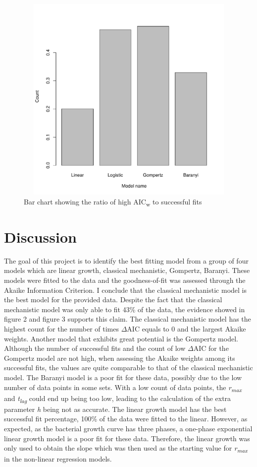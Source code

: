 \documentclass[11pt]{article}
\begin{document}
\begin{figure}[H]
\includegraphics[keepaspectratio, width = 5in, height = 4in]{../results/ratio.pdf}
\centering
\caption{Bar chart showing the ratio of high {AIC\textsubscript{w}} to successful fits}
\end{figure}
\newpage
\section{Discussion}
The goal of this project is to identify the best fitting model from a group of four models which are linear growth, classical mechanistic, Gompertz, Baranyi. These models were fitted to the data and the goodness-of-fit was assessed through the Akaike Information Criterion. I conclude that the classical mechanistic model is the best model for the provided data. Despite the fact that the classical mechanistic model was only able to fit 43\% of the data, the evidence showed in figure 2 and figure 3 supports this claim. The classical mechanistic model has the highest count for the number of times {$\Delta$AIC} equals to 0 and the largest Akaike weights. Another model that exhibits great potential is the Gompertz model. Although the number of successful fits and the count of low {$\Delta$AIC} for the Gompertz model are not high, when assessing the Akaike weights among its successful fits, the values are quite comparable to that of the classical mechanistic model. The Baranyi model is a poor fit for these data, possibly due to the low number of data points in some sets. With a low count of data points, the \emph{r\textsubscript{max}} and \emph{t\textsubscript{lag}} could end up being too low, leading to the calculation of the extra parameter \emph{h} being not as accurate. The linear growth model has the best successful fit percentage, 100\% of the data were fitted to the linear. However, as expected, as the bacterial growth curve has three phases, a one-phase exponential linear growth model is a poor fit for these data. Therefore, the linear growth was only used to obtain the slope which was then used as the starting value for \emph{r\textsubscript{max}} in the non-linear regression models. 
\newpage
\end{document}
